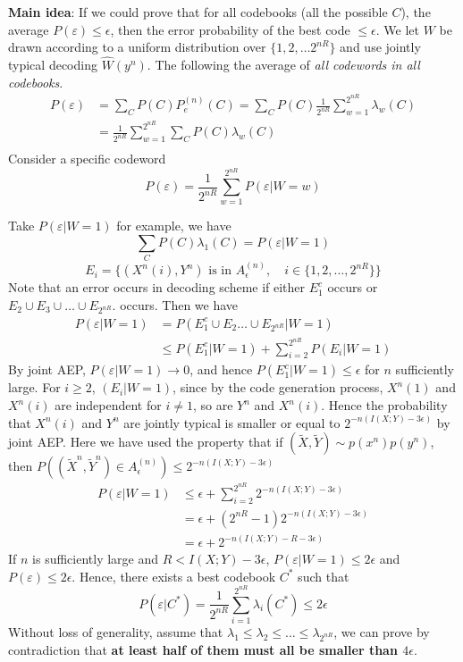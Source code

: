 \documentclass[10pt,landscape, a4paper]{article}
\begin{document}
\begin{multicols}{3}
\textbf{Main idea}: If we could prove that for all codebooks (all the possible $C$), the average $P(\varepsilon)\le \epsilon$, then the error probability of the best code $\le \epsilon$. We let $W$ be drawn according to a uniform distribution over $\{1,2,\dots 2^{nR}\}$ and use jointly typical decoding $\hat{W}(y^n)$. The following the average of \textit{all codewords in all codebooks}.
$$
\begin{aligned}
P(\varepsilon)&=\sum_C P(C)P_e^{(n)}(C)=\sum_C P(C)\frac{1}{2^{nR}}\sum_{w=1}^{2^{nR}}\lambda_w(C)\\
&=\frac{1}{2^{nR}}\sum_{w=1}^{2^{nR}}\sum_CP(C)\lambda_w(C)\\
\end{aligned}
$$
Consider a specific codeword
$$
P(\varepsilon)=\frac{1}{2^{nR}}\sum_{w=1}^{2^{nR}}P(\varepsilon|W=w)
$$

Take $P(\varepsilon|W=1)$ for example, we have
$$
\sum_C P(C)\lambda_1(C)=P(\varepsilon|W=1)
$$
$$
E_i=\{(X^n(i),Y^n)\text{ is in } A_\epsilon^{(n)}, \quad i\in \{1,2,\dots, 2^{nR}\}\}
$$
Note that an error occurs in decoding scheme if either $E_1^c$ occurs or $E_2\cup E_3\cup\dots \cup E_{2^{nR}}. $ occurs. Then we have
$$
\begin{aligned}
P(\varepsilon|W=1)&=P(E_1^c\cup E_2\dots \cup E_{2^{nR}}|W=1)\\
&\le P(E_1^c|W=1)+\sum_{i=2}^{2^{nR}}P(E_i|W=1)
\end{aligned}
$$
By joint AEP, $P(\varepsilon|W=1)\rightarrow 0$, and hence $P(E_1^c|W=1)\le \epsilon$ for $n$ sufficiently large. For $i\ge 2$, $(E_i|W=1)$, since by the code generation process, $X^n(1)$ and $X^n(i)$ are independent for $i\ne 1$, so are $Y^n$ and $X^n(i)$. Hence the probability that $X^n(i)$ and $Y^n$ are jointly typical is smaller or equal to $2^{-n(I(X;Y)-3\epsilon)}$ by joint AEP. Here we have used the property that if $(\tilde{X},\tilde{Y})\sim p(x^n)p(y^n)$, then $P((\tilde{X}^n, \tilde{Y}^n)\in A_\epsilon^{(n)})\le 2^{-n(I(X;Y)-3\epsilon)}$
$$
\begin{aligned}
P(\varepsilon|W=1)&\le \epsilon+\sum_{i=2}^{2^{nR}} 2^{-n(I(X;Y)-3\epsilon)}\\
&=\epsilon+(2^{nR}-1)2^{-n(I(X;Y)-3\epsilon)}\\
&=\epsilon+2^{-n(I(X;Y)-R-3\epsilon)}
\end{aligned}
$$
If $n$ is sufficiently large and $R<I(X;Y)-3\epsilon$, $P(\varepsilon|W=1)\le 2\epsilon$ and $P(\varepsilon)\le 2\epsilon$. Hence, there exists a best codebook $C^*$ such that
$$
P(\varepsilon|C^*)=\frac{1}{2^{nR}}\sum_{i=1}^{2^{nR}}\lambda_i (C^*)\le 2\epsilon
$$
Without loss of generality, assume that $\lambda_1\le \lambda_2\le \dots \le \lambda_{2^{nR}}$, we can prove by contradiction that \textbf{at least half of them must all be smaller than $4\epsilon$}. 


\end{multicols}
\end{document}
